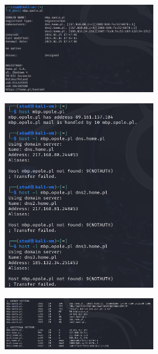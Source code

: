 \documentclass{article}
\begin{document}
\begin{figure}[H]
  \centering
  \includegraphics[width=0.6\textwidth]{whois.png}
\end{figure}

\begin{figure}[H]
  \centering
  \includegraphics[width=0.6\textwidth]{host.png}
\end{figure}

\begin{figure}[H]
  \centering
  \includegraphics[width=0.6\textwidth]{dig_any.png}
\end{figure}
\end{document}
